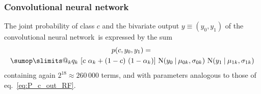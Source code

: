 \documentclass[\ifafour a4paper,12pt,\else a5paper,10pt,\fi%
onecolumn,oneside,article,%
british%
]{memoir}
\makeatletter
\theoremstyle{remark}
\theoremstyle{innote}
\def\sum{\DOTSI\sumop\slimits@}
\renewcommand*{\|}[1][]{\nonscript\:#1\vert\nonscript\:\mathopen{}}
\newcommand*{\eqn}{eq.}%
\newcommand*{\CNN}{convolutional neural network}
\newcommand*{\No}{\mathrm{N}}
\makeatother
\begin{document}
\subsubsection{Convolutional neural network}
\label{sec:curve_CNN}

The joint probability of class $c$ and the bivariate output $y\equiv (y_{0}, y_{1})$ of the \CNN\ is expressed by the sum
\begin{multline}
  \label{eq:P_c_out_CNN}
  p(c, y_{0}, y_{1}) ={}\\ \sum_{k} q_{k}\
  [c\ \alpha_{k} + (1-c)\ (1-\alpha_{k})]\
  \No(y_{0} \| \mu_{0k}, \sigma_{0k})\ 
  \No(y_{1} \| \mu_{1k}, \sigma_{1k})
\end{multline}
containing again $2^{18} \approx 260\,000$ terms, and with parameters analogous to those of \eqn~\eqref{eq:P_c_out_RF}.
\end{document}
